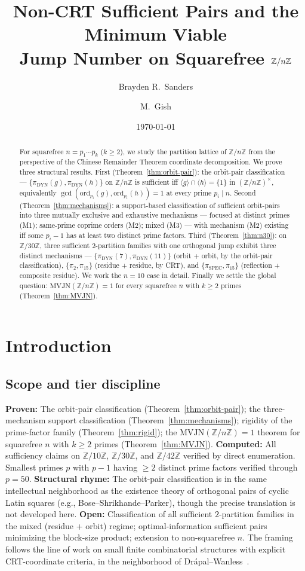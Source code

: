 \documentclass[11pt,reqno]{amsart}
\title[Non-CRT sufficient pairs and MVJN on squarefree $\Z/n\Z$]{Non-CRT Sufficient Pairs and the Minimum Viable\\
Jump Number on Squarefree $\Z/n\Z$}
\author{Brayden R.\ Sanders}
\author{M.\ Gish}
\date{\today}
\theoremstyle{plain}
\theoremstyle{definition}
\newcommand{\Z}{\mathbb{Z}}
\newcommand{\Zn}{\Z/n\Z}
\newcommand{\Zns}{(\Z/n\Z)^{\times}}
\newcommand{\DYN}{\mathrm{DYN}}
\newcommand{\SPEC}{\mathrm{SPEC}}
\newcommand{\ord}{\mathrm{ord}}
\newcommand{\MVJN}{\mathrm{MVJN}}
\begin{document}
\begin{abstract}
For squarefree $n = p_1 \cdots p_k$ ($k \geq 2$), we study the partition lattice of $\Zn$ from the perspective of the Chinese Remainder Theorem coordinate decomposition. We prove three structural results. First (Theorem~\ref{thm:orbit-pair}): the orbit-pair classification --- $\{\pi_{\DYN}(g), \pi_{\DYN}(h)\}$ on $\Zn$ is sufficient iff $\langle g \rangle \cap \langle h \rangle = \{1\}$ in $\Zns$, equivalently $\gcd(\ord_{p_i}(g), \ord_{p_i}(h)) = 1$ at every prime $p_i \mid n$. Second (Theorem~\ref{thm:mechanisms}): a support-based classification of sufficient orbit-pairs into three mutually exclusive and exhaustive mechanisms --- focused at distinct primes (M1); same-prime coprime orders (M2); mixed (M3) --- with mechanism (M2) existing iff some $p_i - 1$ has at least two distinct prime factors. Third (Theorem~\ref{thm:n30}): on $\Z/30\Z$, three sufficient $2$-partition families with one orthogonal jump exhibit three distinct mechanisms --- $\{\pi_{\DYN}(7), \pi_{\DYN}(11)\}$ (orbit + orbit, by the orbit-pair classification), $\{\pi_2, \pi_{15}\}$ (residue + residue, by CRT), and $\{\pi_{\SPEC}, \pi_{15}\}$ (reflection + composite residue). We work the $n = 10$ case in detail. Finally we settle the global question: $\MVJN(\Zn) = 1$ for every squarefree $n$ with $k \geq 2$ primes (Theorem~\ref{thm:MVJN}).
\end{abstract}

\maketitle

\section{Introduction}

\subsection{Scope and tier discipline}

\textbf{Proven:} The orbit-pair classification (Theorem~\ref{thm:orbit-pair}); the three-mechanism support classification (Theorem~\ref{thm:mechanisms}); rigidity of the prime-factor family (Theorem~\ref{thm:rigid}); the $\MVJN(\Zn) = 1$ theorem for squarefree $n$ with $k \geq 2$ primes (Theorem~\ref{thm:MVJN}). \textbf{Computed:} All sufficiency claims on $\Z/10\Z$, $\Z/30\Z$, and $\Z/42\Z$ verified by direct enumeration. Smallest primes $p$ with $p - 1$ having $\geq 2$ distinct prime factors verified through $p = 50$. \textbf{Structural rhyme:} The orbit-pair classification is in the same intellectual neighborhood as the existence theory of orthogonal pairs of cyclic Latin squares (e.g., Bose--Shrikhande--Parker), though the precise translation is not developed here. \textbf{Open:} Classification of all sufficient $2$-partition families in the mixed (residue + orbit) regime; optimal-information sufficient pairs minimizing the block-size product; extension to non-squarefree $n$. The framing follows the line of work on small finite combinatorial structures with explicit CRT-coordinate criteria, in the neighborhood of Drápal--Wanless~\cite{DrapalWanless2021}.
\end{document}
